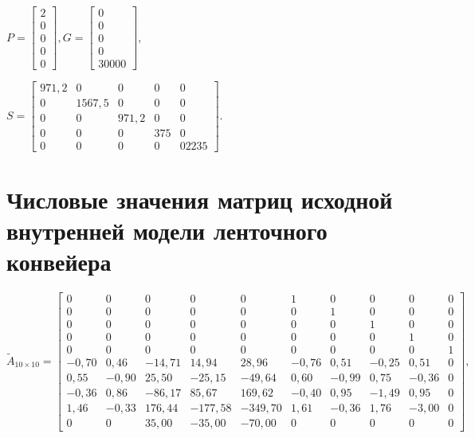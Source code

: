 $
 P = 
\begin{bmatrix}
	2                                \\
	0                                \\
	0                                \\
	0                                \\
	0
\end{bmatrix}, G = 
\begin{bmatrix}
	0                                \\
	0                                \\
	0                                \\
	0                                \\
	30000
\end{bmatrix},
$

\bigskip

$ S =
\begin{bmatrix}
 971,2 & 0      & 0     & 0   & 0        \\
 0     & 1567,5 & 0     & 0   & 0        \\
 0     & 0      & 971,2 & 0   & 0        \\
 0     & 0      & 0     & 375 & 0        \\
 0     & 0      & 0     & 0   & 0 2235 
\end{bmatrix}.
$

\section{Числовые значения матриц исходной внутренней модели ленточного конвейера}\label{Appendix12}

$
\tilde{A}_{10\times10} = 
\begin{bmatrix}
0     & 0     & 0      & 0       & 0       & 1     & 0     & 0     & 0     & 0 \\
0     & 0     & 0      & 0       & 0       & 0     & 1     & 0     & 0     & 0 \\
0     & 0     & 0      & 0       & 0       & 0     & 0     & 1     & 0     & 0 \\
0     & 0     & 0      & 0       & 0       & 0     & 0     & 0     & 1     & 0 \\
0     & 0     & 0      & 0       & 0       & 0     & 0     & 0     & 0     & 1 \\
-0,70 & 0,46  & -14,71 & 14,94   & 28,96   & -0,76 & 0,51  & -0,25 & 0,51  & 0 \\
0,55  & -0,90 & 25,50  & -25,15  & -49,64  & 0,60  & -0,99 & 0,75  & -0,36 & 0 \\
-0,36 & 0,86  & -86,17 & 85,67   & 169,62  & -0,40 & 0,95  & -1,49 & 0,95  & 0 \\
1,46  & -0,33 & 176,44 & -177,58 & -349,70 & 1,61  & -0,36 & 1,76  & -3,00 & 0 \\
0     & 0     & 35,00  & -35,00  & -70,00  & 0     & 0     & 0     & 0     & 0
\end{bmatrix},
$
\bigskip

